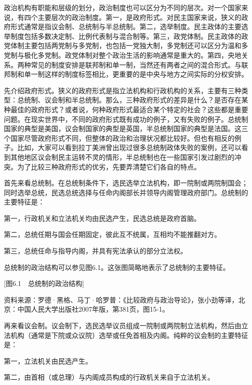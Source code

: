 
政治机构有职能和层级的划分，政治制度也可以区分为不同的层次。对一个国家来说，有四个主要层次的政治制度。第一，是政府形式。对民主国家来说，狭义的政府形式通常是指议会制、总统制与半总统制。第二，选举制度。民主政体的主要选举制度包括多数决定制、比例代表制与混合制等。第三，政党体制。民主政体的政党体制主要包括两党制与多党制，也包括一党独大制，多党制还可以区分为温和多党制与极化多党制。政党体制对整个政治生活的影响通常是重大的。第四，央地关系。两种常见的制度安排是联邦制和单一制，当然还有两者之间的混合形式。与联邦制和单一制这样的制度标签相比，更重要的是中央与地方之间实际的分权安排。

先介绍政府形式。狭义的政府形式是指立法机构和行政机构的关系，主要有三种类型：总统制、议会制和半总统制。那么，三种政府形式的差异是什么？是否存在某种最佳的政府形式？或者说，何种政府形式最适合某个特定的社会？这些都是重要问题。在现实世界中，不同的政府形式既有成功的例子，又有失败的例子。总统制国家的典型是美国，议会制国家的典型是英国，半总统制国家的典型是法国。这三个国家尽管政府形式不同，但整体的政治和治理状况都比较好。但也有相反的例子。比如，大家可以看到拉丁美洲曾出现过很多总统制政体失败的案例，还可以看到其他地区议会制民主运转不灵的情形，半总统制也在一些国家引发过剧烈的冲突。为了比较三种政府形式的优劣，先要弄清楚它们各自的特点。

首先来看总统制。在总统制条件下，选民选举立法机构，即一院制或两院制国会；同时选举总统，民选总统选择与任命内阁部长并领导内阁管理政府部门。总统制的主要特征是：

第一，行政机关和立法机关均由民选产生，民选总统是政府首脑。

第二，总统任期与国会任期固定，彼此互不统属，互相均不能推翻对方。

第三，总统任命与指导内阁，并具有宪法承认的部分立法权。

总统制的政治结构可以参见图6.1。这张图简略地表示了总统制的主要特征。

[图6.1　总统制的政治结构]

资料来源：罗德·黑格、马丁·哈罗普：《比较政府与政治导论》，张小劲等译，北京：中国人民大学出版社2007年版，第381页，图15-1。

再来看议会制。议会制下，选民选举议员组成一院制或两院制立法机构，然后由立法机构（通常是下院或众议院）选举或任免首相及内阁。纯粹的议会制的主要特征是：

第一，立法机关由民选产生。

第二，由首相（或总理）与内阁成员构成的行政机关来自于立法机关。

